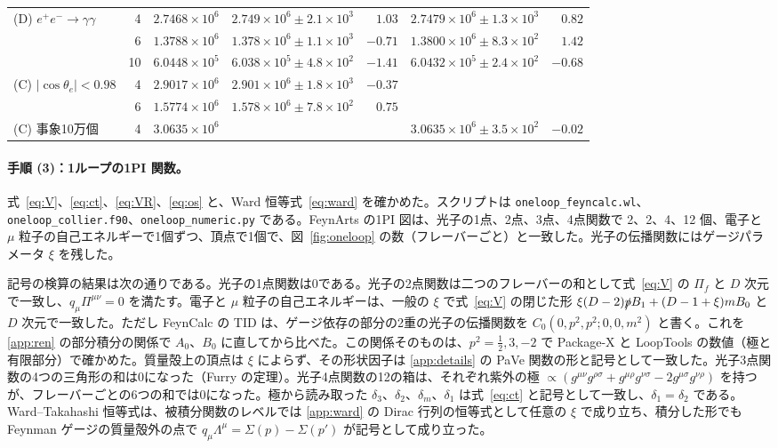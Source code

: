 \documentclass[a4paper,10pt]{ltjsarticle}
\begin{document}
\begin{table}[tbp]
\begin{tabular}{lrrrrrr}
(D) $e^+e^-\to\gamma\gamma$ & 4 & $2.7468\times10^{6}$ & $2.749\times10^{6}\pm2.1\times10^{3}$ & $1.03$ & $2.7479\times10^{6}\pm1.3\times10^{3}$ & $0.82$ \\
 & 6 & $1.3788\times10^{6}$ & $1.378\times10^{6}\pm1.1\times10^{3}$ & $-0.71$ & $1.3800\times10^{6}\pm8.3\times10^{2}$ & $1.42$ \\
 & 10 & $6.0448\times10^{5}$ & $6.038\times10^{5}\pm4.8\times10^{2}$ & $-1.41$ & $6.0432\times10^{5}\pm2.4\times10^{2}$ & $-0.68$ \\
\midrule
(C) $|\cos\theta_e|<0.98$ & 4 & $2.9017\times10^{6}$ & $2.901\times10^{6}\pm1.8\times10^{3}$ & $-0.37$ & & \\
 & 6 & $1.5774\times10^{6}$ & $1.578\times10^{6}\pm7.8\times10^{2}$ & $0.75$ & & \\
(C) 事象10万個 & 4 & $3.0635\times10^{6}$ & & & $3.0635\times10^{6}\pm3.5\times10^{2}$ & $-0.02$ \\
\bottomrule
\end{tabular}
\end{table}

\paragraph{手順 (3)：1ループの1PI 関数。}式~\eqref{eq:V}、\eqref{eq:ct}、\eqref{eq:VR}、\eqref{eq:os} と、Ward 恒等式~\eqref{eq:ward} を確かめた。スクリプトは \texttt{oneloop\_feyncalc.wl}、\texttt{oneloop\_collier.f90}、\texttt{oneloop\_numeric.py} である。FeynArts の1PI 図は、光子の1点、2点、3点、4点関数で 2、2、4、12 個、電子と $\mu$ 粒子の自己エネルギーで1個ずつ、頂点で1個で、図~\ref{fig:oneloop} の数（フレーバーごと）と一致した。光子の伝播関数にはゲージパラメータ $\xi$ を残した。

記号の検算の結果は次の通りである。光子の1点関数は0である。光子の2点関数は二つのフレーバーの和として式~\eqref{eq:V} の $\Pi_f$ と $D$ 次元で一致し、$q_\mu\Pi^{\mu\nu}=0$ を満たす。電子と $\mu$ 粒子の自己エネルギーは、一般の $\xi$ で式~\eqref{eq:V} の閉じた形 $\xi(D-2)\slashed pB_1+(D-1+\xi)mB_0$ と $D$ 次元で一致した。ただし FeynCalc の TID は、ゲージ依存の部分の2重の光子の伝播関数を $C_0(0,p^2,p^2;0,0,m^2)$ と書く。これを \ref{app:ren} の部分積分の関係で $A_0$、$B_0$ に直してから比べた。この関係そのものは、$p^2=\frac12,3,-2$ で Package-X と LoopTools の数値（極と有限部分）で確かめた。質量殻上の頂点は $\xi$ によらず、その形状因子は \ref{app:details} の PaVe 関数の形と記号として一致した。光子3点関数の4つの三角形の和は0になった（Furry の定理）。光子4点関数の12の箱は、それぞれ紫外の極 $\propto(g^{\mu\nu}g^{\rho\sigma}+g^{\mu\rho}g^{\nu\sigma}-2g^{\mu\sigma}g^{\nu\rho})$ を持つが、フレーバーごとの6つの和では0になった。極から読み取った $\delta_3$、$\delta_2$、$\delta_m$、$\delta_1$ は式~\eqref{eq:ct} と記号として一致し、$\delta_1=\delta_2$ である。Ward--Takahashi 恒等式は、被積分関数のレベルでは \ref{app:ward} の Dirac 行列の恒等式として任意の $\xi$ で成り立ち、積分した形でも Feynman ゲージの質量殻外の点で $q_\mu\Lambda^\mu=\Sigma(p)-\Sigma(p')$ が記号として成り立った。
\end{document}
